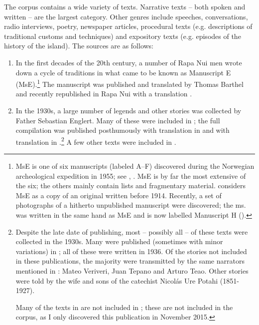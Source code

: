 The corpus contains a wide variety of texts. Narrative texts – both spoken and written – are the largest category. Other genres include speeches, conversations, radio interviews, poetry, newspaper articles, procedural texts (e.g. descriptions of traditional customs and techniques) and expository texts (e.g. episodes of the history of the island). The sources are as follows:

\newpage
\begin{enumerate}
\item 
In the first decades of the 20th century, a number of Rapa Nui men wrote down a cycle of traditions in what came to be known as Manuscript E (MsE).\footnote{\label{fn:27}MsE is one of six manuscripts (labeled A–F) discovered during the Norwegian archeological expedition in 1955; see \citet{Barthel1965}, \citet{HorleyLópezLabbé2014}. MsE is by far the most extensive of the six; the others mainly contain lists and fragmentary material. \citet[298]{Barthel1978} considers MsE as a copy of an original written before 1914. Recently, a set of photographs of a hitherto unpublished manuscript were discovered; the ms. was written in the same hand as MsE and is now labelled Manuscript H (\citealt{HorleyLópezLabbé2014,HorleyLópezLabbé2015}).} The manuscript was published and translated by Thomas Barthel \citep{Barthel1978} and recently republished in Rapa Nui with a  translation \citep{Frontier2008}. 

\item 
In the 1930s, a large number of legends and other stories was collected by Father Sebastian Englert. Many of these were included in \citet{Englert1939Huru1,Englert1939Huru2,Englert1939Tradiciones}; the full compilation was published posthumously with  translation in \citet{Englert1980} and with  translation in \citet{Englert2001}.\footnote{\label{fn:28}Despite the late date of publishing, most – possibly all – of these texts were collected in the 1930s. Many were published (sometimes with minor variations) in \citet{Englert1939Huru1,Englert1939Huru2,Englert1939Tradiciones}; all of these were written in 1936. Of the stories not included in these publications, the majority were transmitted by the same narrators mentioned in \citet{Englert1939Huru1,Englert1939Huru2,Englert1939Tradiciones}: Mateo Veriveri, Juan Tepano and Arturo Teao. Other stories were told by the wife and sons of the catechist Nicolás Ure Potahi (1851-1927). 

Many of the texts in \citet{Englert1939Huru2} are not included in \citet{Englert1980}; these are not included in the corpus, as I only discovered this publication in November 2015.} A few other texts were included in \citet{Englert1948}.


\end{enumerate}
